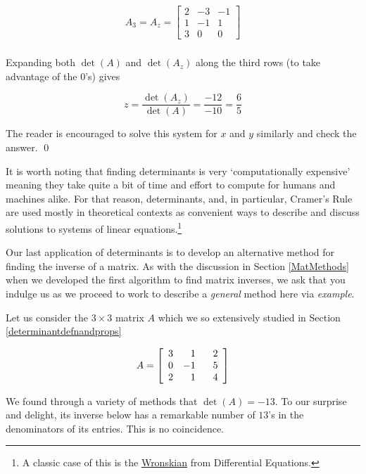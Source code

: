 \documentclass{ximera}
\begin{document}
\begin{example}
\begin{enumerate}
\[\begin{array}{cccc}
A_3 = A_{z} =  \left[ \begin{array}{rrr} 2 & -3 & -1 \\ 1 & -1 & 1 \\ 3 & 0 & 0 \end{array} \right] \\

\end{array} \]

Expanding both $\det(A)$ and $\det\left(A_{z}\right)$ along the third rows (to take advantage of the $0$'s) gives

\[ z = \frac{\det\left(A_{z}\right)}{\det(A)} = \frac{-12}{-10} = \frac{6}{5} \]

The reader is encouraged to solve this system for $x$ and $y$ similarly and check the answer.  \qed

\end{enumerate}

\end{example}

It is worth noting that finding determinants is very `computationally expensive' meaning they take quite a bit of time and effort to compute for humans and machines alike.  For that reason, determinants, and, in particular, Cramer's Rule are used mostly in theoretical contexts as convenient ways to describe and discuss solutions to systems of linear equations.\footnote{A classic case of this is the \href{https://en.wikipedia.org/wiki/Wronskian}{\underline{Wronskian}} from Differential Equations.}

 

Our last application of determinants is to develop an alternative method for finding the inverse of a matrix. As with the discussion in Section \ref{MatMethods} when we developed the first algorithm to find matrix inverses, we ask that you indulge us as we proceed to work to describe a \textit{general} method here via \textit{example}. 

Let us consider the $3 \times 3$ matrix $A$ which we so extensively studied in Section \ref{determinantdefnandprops}

\[A = \left[ \begin{array}{rrr} 3 & 1 & \hphantom{-}2 \\ 0 & -1 & 5 \\ 2 & 1 & 4 \\ \end{array} \right]\]

We found through a variety of methods that $\det(A) = -13$.  To our surprise and delight, its inverse below has a remarkable number of $13$'s in the denominators of its entries. This is no coincidence.
\end{document}
